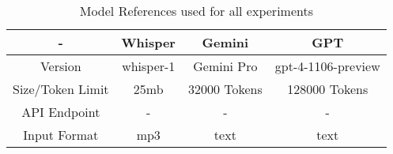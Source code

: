 

\begin{table}[ht]
    \centering
    \begin{tabular}{|c|c|c|c|}
        \hline - & \textbf{Whisper} & \textbf{Gemini}  & \textbf{GPT} \\
        \hline Version & whisper-1  &  Gemini Pro & gpt-4-1106-preview \\
        \hline Size/Token Limit & 25mb  & 32000 Tokens & 128000 Tokens \\
        \hline API Endpoint & - & - & - \\   
        \hline Input Format & mp3 & text & text \\
  \hline

    \end{tabular}
    \caption{Model References used for all experiments}
    \label{tab:standard_params}
\end{table}